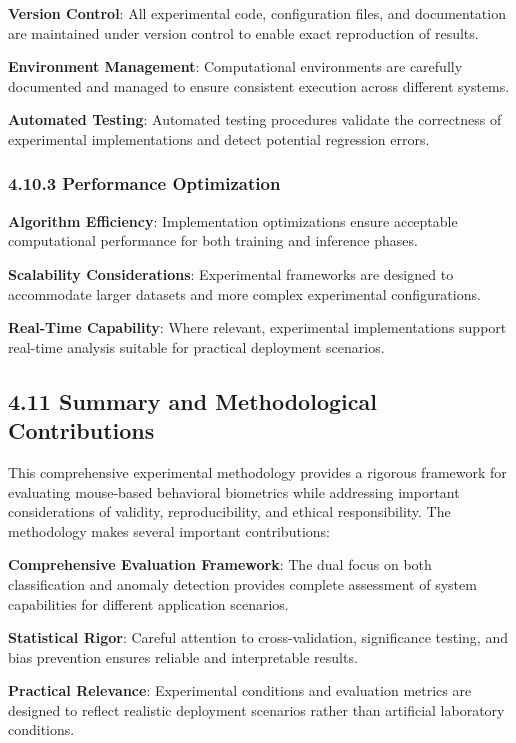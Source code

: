\documentclass[
  11pt,
  a4paper,
]{article}
\begin{document}
\textbf{Version Control}: All experimental code, configuration files,
and documentation are maintained under version control to enable exact
reproduction of results.

\textbf{Environment Management}: Computational environments are
carefully documented and managed to ensure consistent execution across
different systems.

\textbf{Automated Testing}: Automated testing procedures validate the
correctness of experimental implementations and detect potential
regression errors.

\subsubsection{4.10.3 Performance
Optimization}\label{performance-optimization}

\textbf{Algorithm Efficiency}: Implementation optimizations ensure
acceptable computational performance for both training and inference
phases.

\textbf{Scalability Considerations}: Experimental frameworks are
designed to accommodate larger datasets and more complex experimental
configurations.

\textbf{Real-Time Capability}: Where relevant, experimental
implementations support real-time analysis suitable for practical
deployment scenarios.

\subsection{4.11 Summary and Methodological
Contributions}\label{summary-and-methodological-contributions}

This comprehensive experimental methodology provides a rigorous
framework for evaluating mouse-based behavioral biometrics while
addressing important considerations of validity, reproducibility, and
ethical responsibility. The methodology makes several important
contributions:

\textbf{Comprehensive Evaluation Framework}: The dual focus on both
classification and anomaly detection provides complete assessment of
system capabilities for different application scenarios.

\textbf{Statistical Rigor}: Careful attention to cross-validation,
significance testing, and bias prevention ensures reliable and
interpretable results.

\textbf{Practical Relevance}: Experimental conditions and evaluation
metrics are designed to reflect realistic deployment scenarios rather
than artificial laboratory conditions.
\end{document}
